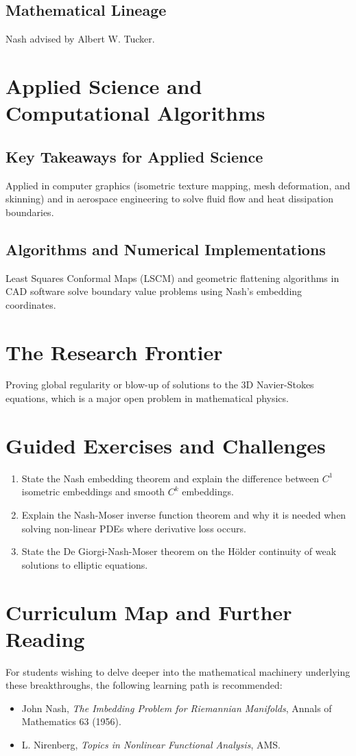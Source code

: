 \subsection{Mathematical Lineage}
Nash advised by Albert W. Tucker.

\section{Applied Science and Computational Algorithms}
\subsection{Key Takeaways for Applied Science}
Applied in computer graphics (isometric texture mapping, mesh deformation, and skinning) and in aerospace engineering to solve fluid flow and heat dissipation boundaries.

\subsection{Algorithms and Numerical Implementations}
Least Squares Conformal Maps (LSCM) and geometric flattening algorithms in CAD software solve boundary value problems using Nash's embedding coordinates.

\section{The Research Frontier}
Proving global regularity or blow-up of solutions to the 3D Navier-Stokes equations, which is a major open problem in mathematical physics.

\section{Guided Exercises and Challenges}
\begin{enumerate}[label=\textbf{\arabic*.}]
  \item State the Nash embedding theorem and explain the difference between $C^1$ isometric embeddings and smooth $C^k$ embeddings.
  \item Explain the Nash-Moser inverse function theorem and why it is needed when solving non-linear PDEs where derivative loss occurs.
  \item State the De Giorgi-Nash-Moser theorem on the H\"older continuity of weak solutions to elliptic equations.
\end{enumerate}

\section{Curriculum Map and Further Reading}
For students wishing to delve deeper into the mathematical machinery underlying these breakthroughs, the following learning path is recommended:
\begin{itemize}
  \item John Nash, \emph{The Imbedding Problem for Riemannian Manifolds}, Annals of Mathematics 63 (1956).
  \item L. Nirenberg, \emph{Topics in Nonlinear Functional Analysis}, AMS.
\end{itemize}

